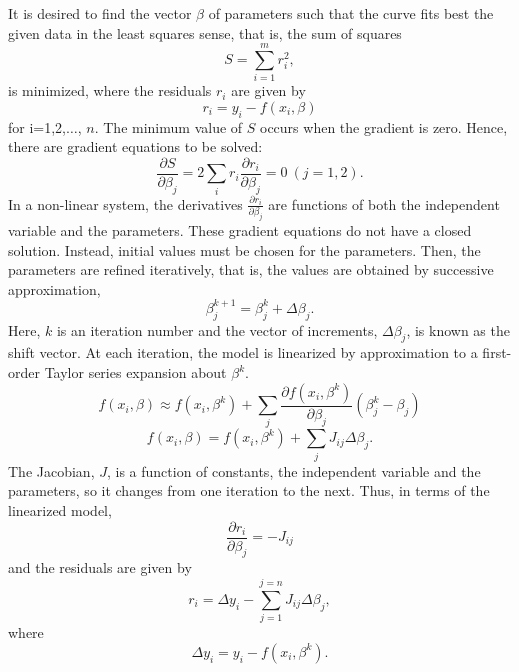 \documentclass[a4paper,10pt]{report}
\begin{document}
It is desired to find the vector $\beta$ of parameters such that the curve fits best the given data in the least squares sense, that is, the sum of squares
\begin{equation}
    S=\sum_{i=1}^{m}r_i^2 ,
\end{equation}
is minimized, where the residuals $r_i$ are given by
\begin{equation}
    r_i = y_i - f(x_i,\beta)
\end{equation}
for i=1,2,$\dots$, $n$.
\newline
The minimum value of $S$ occurs when the gradient is zero. Hence, there are gradient equations to be solved:
\begin{equation}
    \frac{\partial S}{\partial \beta_j}=2\sum_i r_i\frac{\partial r_i}{\partial \beta_j}=0 \ (j=1,2).
\end{equation}
In a non-linear system, the derivatives $\frac{\partial r_i}{\partial \beta_j}$ are functions of both the independent variable and the parameters. These gradient equations do not have a closed solution. Instead, initial values must be chosen for the parameters. Then, the parameters are refined iteratively, that is, the values are obtained by successive approximation,
\begin{equation}
    \beta_j^{k+1}=\beta^k_j+\Delta \beta_j.
\end{equation}
Here, $k$ is an iteration number and the vector of increments, $\Delta \beta_j$, is known as the shift vector. At each iteration,
the model is linearized by approximation to a first-order Taylor series expansion about $\beta^k$.
\begin{equation}
    f(x_i,\beta)\approx f(x_i,\beta^k) +\sum_j \frac{\partial f(x_i, \beta^k)}{\partial \beta_j} \left(\beta^k_j -\beta_j \right)
\end{equation}
\begin{equation}
 f(x_i,\beta) =f(x_i, \beta^k)+\sum_j J_{ij} \Delta\beta_j.
\end{equation}
The Jacobian, $J$, is a function of constants, the independent variable and the parameters, so it changes from one iteration to the
next. Thus, in terms of the linearized model,
\begin{equation}
\frac{\partial r_i}{\partial \beta_j}=-J_{ij}
\end{equation}
and the residuals are given by
\begin{equation}
    r_i=\Delta y_i- \sum_{j=1}^{j=n} J_{ij}\Delta\beta_j,
\end{equation}
where
\begin{equation}
 \Delta y_i=y_i- f(x_i, \beta^k).
\end{equation}
\end{document}

